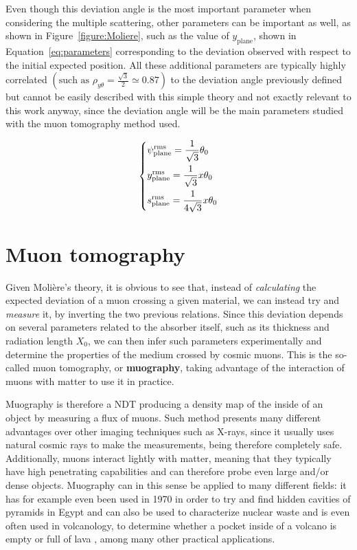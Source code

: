 \documentclass[a4paper, 11pt]{report}
\begin{document}
Even though this deviation angle is the most important parameter when considering the multiple scattering, other parameters can be important as well, as shown in Figure~\ref{figure:Moliere}, such as the value of $y_\text{plane}$, shown in Equation~\ref{eq:parameters} corresponding to the deviation observed with respect to the initial expected position. All these additional parameters are typically highly correlated $\left (\text{such as } \rho_{y \theta} = \frac{\sqrt{3}}{2} \simeq 0.87 \right)$ to the deviation angle previously defined but cannot be easily described with this simple theory and not exactly relevant to this work anyway, since the deviation angle will be the main parameters studied with the muon tomography method used.

\begin{equation}
    \label{eq:parameters}
    \begin{dcases}
    \psi_{\text{plane}}^{\text{rms}} = \frac{1}{\sqrt{3}} \theta_0 \\
    y_{\text{plane}}^{\text{rms}} = \frac{1}{\sqrt{3}} x \theta_0 \\
    s_{\text{plane}}^{\text{rms}} = \frac{1}{4 \sqrt{3}} x \theta_0
    \end{dcases}
\end{equation}

\section{Muon tomography} \label{sec:tomography}

Given Moli\`ere's theory, it is obvious to see that, instead of \textit{calculating} the expected deviation of a muon crossing a given material, we can instead try and \textit{measure} it, by inverting the two previous relations. Since this deviation depends on several parameters related to the absorber itself, such as its thickness and radiation length $X_0$, we can then infer such parameters experimentally and determine the properties of the medium crossed by cosmic muons. This is the so-called muon tomography, or \textbf{muography}, taking advantage of the interaction of muons with matter to use it in practice.

Muography is therefore a NDT producing a density map of the inside of an object by measuring a flux of muons. Such method presents many different advantages over other imaging techniques such as X-rays, since it usually uses natural cosmic rays to make the measurements, being therefore completely safe. Additionally, muons interact lightly with matter, meaning that they typically have high penetrating capabilities and can therefore probe even large and/or dense objects. Muography can in this sense be applied to many different fields: it has for example even been used in 1970 in order to try and find hidden cavities of pyramids in Egypt \cite{Egypt} and can also be used to characterize nuclear waste \cite{waste} and is even often used in volcanology, to determine whether a pocket inside of a volcano is empty or full of lava \cite{lava}, among many other practical applications. 
\end{document}

